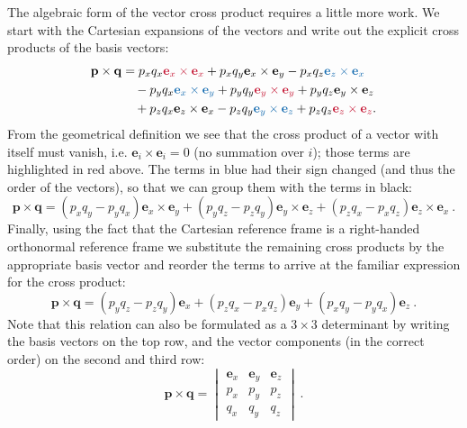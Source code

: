 \begin{itemize}
	The algebraic form of the vector cross product requires a little more work. We start with the Cartesian expansions of the vectors and write out the explicit cross products of the basis vectors:
	\begin{equation}
		\begin{split}
			\mathbf{p}\times\mathbf{q} 	&= p_xq_x {\color{OCCarnegieRed}\mathbf{e}_x\times\mathbf{e}_x} + p_xq_y \mathbf{e}_x\times\mathbf{e}_y-p_xq_z {\color{OCblue}\mathbf{e}_z\times\mathbf{e}_x}\\
									&\quad - p_yq_x {\color{OCblue}\mathbf{e}_x\times\mathbf{e}_y} + p_yq_y {\color{OCCarnegieRed}\mathbf{e}_y\times\mathbf{e}_y}+p_yq_z \mathbf{e}_y\times\mathbf{e}_z\\
									&\quad+ p_zq_x \mathbf{e}_z\times\mathbf{e}_x - p_zq_y {\color{OCblue}\mathbf{e}_y\times\mathbf{e}_z}+p_zq_z {\color{OCCarnegieRed}\mathbf{e}_z\times\mathbf{e}_z}.
		\end{split}
	\end{equation}
	From the geometrical definition we see that the cross product of a vector with itself must vanish, i.e. $\mathbf{e}_i\times\mathbf{e}_i=0$ (no summation over $i$); those terms are highlighted in red above.  The terms in blue had their sign changed (and thus the order of the vectors), so that we can group them with the terms in black:
	\begin{equation}
		\mathbf{p}\times\mathbf{q} = (p_xq_y- p_yq_x) \mathbf{e}_x\times\mathbf{e}_y+(p_yq_z-p_zq_y) \mathbf{e}_y\times\mathbf{e}_z+(p_zq_x-p_xq_z) \mathbf{e}_z\times\mathbf{e}_x\ .
	\end{equation}
	Finally, using the fact that the Cartesian reference frame is a right-handed orthonormal reference frame we substitute the remaining cross products by the appropriate basis vector and reorder the terms to arrive at the familiar expression for the cross product:
	\begin{equation}
		\mathbf{p}\times\mathbf{q} = (p_yq_z-p_zq_y) \mathbf{e}_x+(p_zq_x-p_xq_z) \mathbf{e}_y+(p_xq_y- p_yq_x) \mathbf{e}_z\ .
	\end{equation}
	Note that this relation can also be formulated as a $3\times 3$ determinant by writing the basis vectors on the top row, and the vector components (in the correct order) on the second and third row:
	\begin{equation}
		\mathbf{p}\times\mathbf{q} = \begin{vmatrix}\mathbf{e}_x&\mathbf{e}_y&\mathbf{e}_z\\ p_x&p_y&p_z\\ q_x&q_y&q_z\end{vmatrix}\ . 
	\end{equation}
	
\end{itemize}


